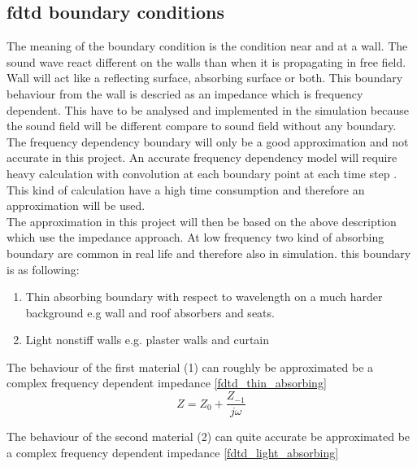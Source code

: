 \subsection{\gls{fdtd} boundary conditions}        
The meaning of the boundary condition is the condition near and at a wall. The sound wave react different on the walls than when it is propagating in free field. Wall will act like a reflecting surface, absorbing surface or both. This boundary behaviour from the wall is descried as an impedance which is frequency dependent. This have to be analysed and implemented in the simulation because the sound field will be different compare to sound field without any boundary. The frequency dependency boundary will only be a good approximation and not accurate in this project. An accurate frequency dependency model will require heavy calculation with convolution at each boundary point at each time step \citep{finiteproblems}. This kind of calculation have a high time consumption and therefore an approximation will be used. \\
The approximation in this project will then be based on the above description which use the impedance approach. \citep{FDTDmodelling} At low frequency two kind of absorbing boundary are common in real life and therefore also in simulation. this boundary is as following:

\begin{enumerate}
\item Thin absorbing boundary with respect to wavelength on a much harder background e.g wall and roof absorbers and seats.
\item Light nonstiff walls e.g. plaster walls and curtain 
\end{enumerate}


The behaviour of the first material (1) can roughly be approximated be a complex frequency dependent impedance \autoref{fdtd_thin_absorbing}
\begin{equation}\label{fdtd_thin_absorbing}
Z= Z_0+\frac{Z_{-1}}{j\omega}
\end{equation}

         \startexplain
    \stopexplain

The behaviour of the second material (2) can quite accurate be approximated be a complex frequency dependent impedance \autoref{fdtd_light_absorbing}

